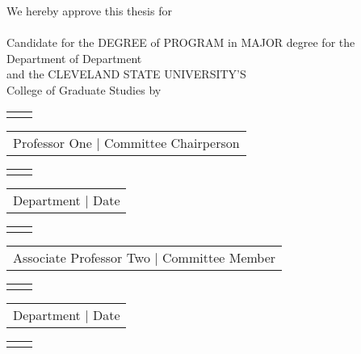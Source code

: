 \newpage
\thispagestyle{empty}

\begin{center}   
  We hereby approve this thesis for\\
  \MakeUppercase{\@author}\\
  Candidate for the DEGREE of PROGRAM in MAJOR degree for the\\
  Department of Department\\
  and the CLEVELAND STATE UNIVERSITY'S\\
  College of Graduate Studies by

  \bigskip
  \bigskip
  \bigskip  

  \singlespacing

  \begin{tabular}{@{}p{5in}p{6in}@{}}
    \hrulefill
  \end{tabular}

  \begin{tabular}{c}
    Professor One | Committee Chairperson\\
  \end{tabular}
  \vfill
  
  \begin{tabular}{@{}p{5in}p{6in}@{}}
    \hrulefill
  \end{tabular}

  \begin{tabular}{c}
    Department | Date\\
  \end{tabular}
  \vfill    
  
  \begin{tabular}{@{}p{5in}p{6in}@{}}
    \hrulefill
  \end{tabular}

  \begin{tabular}{c}
    Associate Professor Two | Committee Member\\
  \end{tabular}
  \vfill  

  \begin{tabular}{@{}p{5in}p{6in}@{}}
    \hrulefill
  \end{tabular}

  \begin{tabular}{c}
    Department | Date\\
  \end{tabular}
  \vfill  
  
  \begin{tabular}{@{}p{5in}p{6in}@{}}
    \hrulefill
  \end{tabular}


\end{center}
